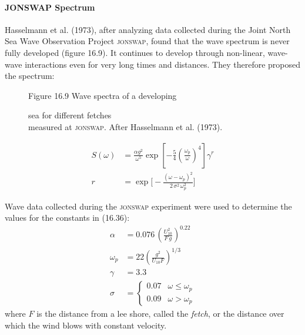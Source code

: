 \paragraph{JONSWAP Spectrum}Hasselmann et al. (1973), after analyzing data
collected during the Joint North Sea Wave Observation Project
\textsc{jonswap}, found that the wave spectrum is never fully developed (figure 16.9). It
continues to develop through non-linear, wave-wave interactions even for very long times and
distances. They therefore proposed the spectrum:

\begin{figure}[t!]
\footnotesize
\centering
Figure 16.9 Wave spectra of a developing \rule{0mm}{3ex}sea for different
fetches\\measured at \textsc{jonswap}. After Hasselmann et al. (1973).

\label{fig:hasselmannspect}

\vspace{-3ex}
\end{figure}

\begin{subequations}
\begin{align}
S(\omega) &= \frac{\alpha g^{2}}{\omega ^{5}} \exp \left[ - \frac{5}{4}
\left(
\frac{\omega _{p}}{\omega } \right) ^{4} \right] \gamma ^{r} \\
r &= \exp \biggl[ - \frac{\left(\omega - \omega _{p}\right)^{2}}{2\, \sigma ^{2}
\,\omega _{p}^{2}}
\biggr]
\end{align}
\end{subequations}

Wave data collected during the \textsc{jonswap} experiment were used to
determine the values for the constants in (16.36):
\begin{subequations}
\begin{align}
\alpha &= 0.076 \, \left( \frac{U_{10}^{2}}{F \, g} \right)^{0.22} \\
\omega_p &= 22 \left(\frac{g^2}{U_{10}F}\right)^{1/3} \\
\gamma &= 3.3 \\
   \sigma &= \left\{ \begin{array}{ll}
                    0.07 & \omega \leq \omega _{p} \\
                    0.09 & \omega > \omega _{p}
                    \end{array}
            \right.
\end{align}
\end{subequations}
where $F$ is the distance from a lee shore, called the \textit{fetch},
or the distance over which the wind blows with constant velocity.

